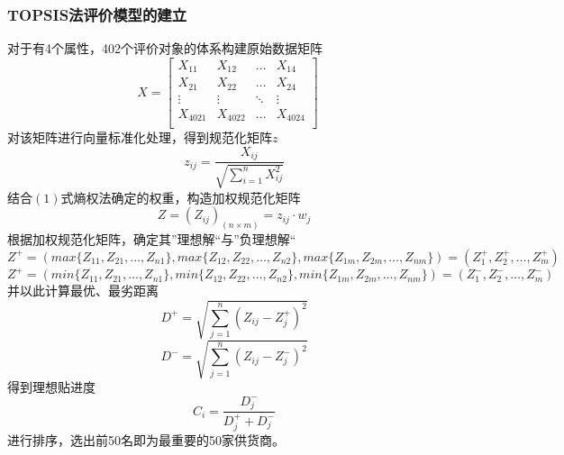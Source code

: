 \documentclass{cumcmthesis}
\begin{document}
\subsubsection*{TOPSIS法评价模型的建立}
对于有4个属性，402个评价对象的体系构建原始数据矩阵
\begin{equation}
    X=\begin{bmatrix}
        X_{11}   & X_{12}   & \dots  & X_{14}   \\
        X_{21}   & X_{22}   & \dots  & X_{24}   \\
        \vdots   & \vdots   & \ddots & \vdots   \\
        X_{4021} & X_{4022} & \dots  & X_{4024} \\
    \end{bmatrix} \quad
    \nonumber
    \label{数据矩阵}
\end{equation}
对该矩阵进行向量标准化处理，得到规范化矩阵$z$
\begin{equation}
    z_{ij}=\frac{X_{ij}}{\sqrt{\sum\limits^n_{i=1}X^2_{ij}}}\nonumber
    \label{规范化矩阵}
\end{equation}
结合$(1)$式熵权法确定的权重，构造加权规范化矩阵
\begin{equation}
    Z=(Z_{ij})_{(n\times m)}=z_{ij}\cdot w_j\nonumber
    \label{加权规范化矩阵}
\end{equation}
根据加权规范化矩阵，确定其”理想解“与”负理想解“
\begin{equation}
    Z^+ = (max\{Z_{11},Z{_21},\dots,Z_{n1}\},max\{Z_{12},Z_{22},\dots,Z_{n2}\},max\{Z_{1m},Z_{2m},\dots,Z_{nm}\}) =(Z^+_1,Z^+_2,\dots,Z^+_m)\nonumber
\end{equation}
\begin{equation}
    Z^+ = (min\{Z_{11},Z{_21},\dots,Z_{n1}\},min\{Z_{12},Z_{22},\dots,Z_{n2}\},min\{Z_{1m},Z_{2m},\dots,Z_{nm}\}) =(Z^-_1,Z^-_2,\dots,Z^-_m)\nonumber
\end{equation}
并以此计算最优、最劣距离
\begin{equation}
    D^+=\sqrt{\sum_{j=1}^{n}{(Z_{ij}-Z^+_j)^2}}\nonumber
\end{equation}
\begin{equation}
    D^-=\sqrt{\sum_{j=1}^{n}{(Z_{ij}-Z^-_j)^2}}\nonumber
\end{equation}
得到理想贴进度
\begin{equation}
    C_i=\frac{D^-_j}{D^+_j+D^-_j}\nonumber
\end{equation}
进行排序，选出前50名即为最重要的50家供货商。
\end{document}
